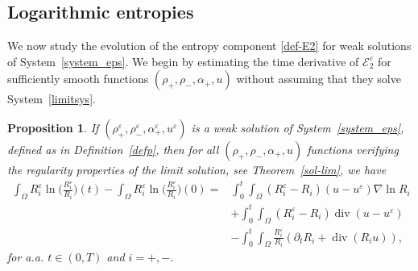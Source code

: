 \documentclass[11pt, twoside, a4paper]{article}
\theoremstyle{plain}
\newtheorem{proposition}[theorem]{Proposition}
\theoremstyle{remark}
\numberwithin{equation}{section}
\def\EE{{\mathcal E}}
\renewcommand{\div}{\operatorname{div}}
\renewcommand{\epsilon}{\varepsilon}
\newcommand{\dt}{\partial_t}
\newcommand{\eps}{\varepsilon}
\begin{document}
\subsection{Logarithmic entropies}

We now study the evolution of the entropy component \eqref{def-E2} for weak solutions of System~\eqref{system_eps}. 
We begin by estimating the time derivative of $\EE^\eps_2$ for sufficiently smooth functions $(\rho_+,\rho_-,\alpha_+,u)$ without assuming that they solve System~\eqref{limitsys}.

\begin{proposition}\label{prop1E2}
If $(\rho^{\epsilon}_+,\rho^{\epsilon}_-,\alpha^{\epsilon}_+,u^{\epsilon})$ is a weak solution of System~\eqref{system_eps}, defined as in Definition~\ref{defp}, then for all $(\rho_+,\rho_-,\alpha_+,u)$ functions verifying the regularity properties of the limit solution, see Theorem~\ref{sol-lim}, we have
\begin{align*}
 \int_\Omega R_i^\eps \ln\Big(\frac{R_i^\eps}{R_i} \Big) (t) - \int_\Omega R_i^\eps \ln\Big(\frac{R_i^\eps}{R_i} \Big)(0) =& \int_0^t\!\!\! \int_\Omega (R_i^\eps - R_i)(u - u^\eps) \nabla \ln R_i \\
 &+ \int_0^t\!\!\! \int_\Omega (R_i^\eps - R_i) \div (u-u^\eps)\\
 &- \int_0^t\!\!\! \int_\Omega \frac{R_i^\eps}{R_i} (\dt R_i + \div ( R_iu)),
\end{align*}
for a.a. $t\in (0,T)$ and $i=+,-$.
\end{proposition}
\end{document}
